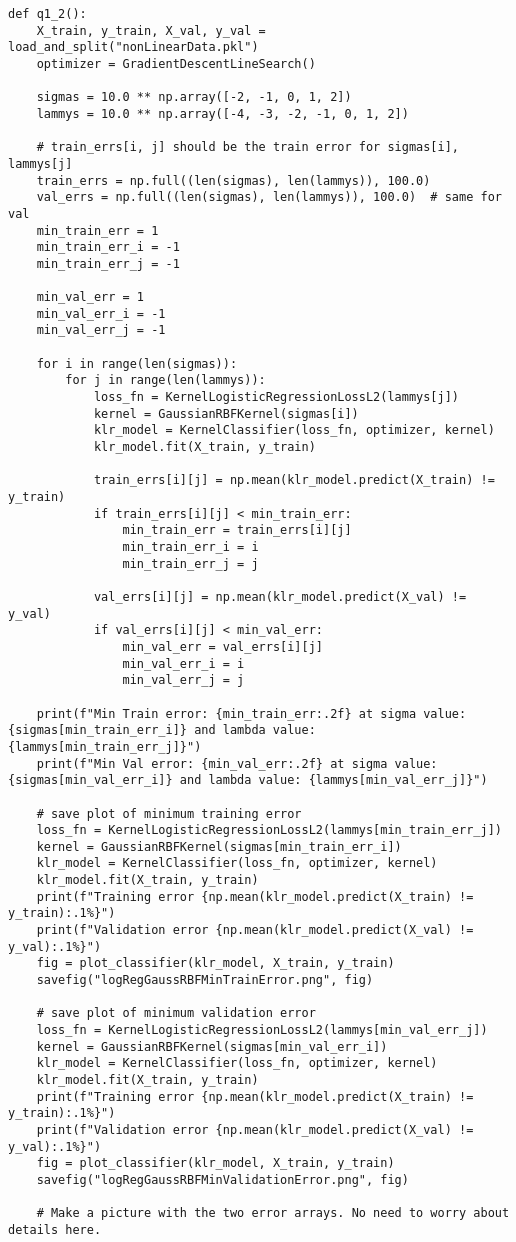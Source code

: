 \documentclass{article}
\begin{document}
\begin{verbatim}
def q1_2():
    X_train, y_train, X_val, y_val = load_and_split("nonLinearData.pkl")
    optimizer = GradientDescentLineSearch()

    sigmas = 10.0 ** np.array([-2, -1, 0, 1, 2])
    lammys = 10.0 ** np.array([-4, -3, -2, -1, 0, 1, 2])

    # train_errs[i, j] should be the train error for sigmas[i], lammys[j]
    train_errs = np.full((len(sigmas), len(lammys)), 100.0)
    val_errs = np.full((len(sigmas), len(lammys)), 100.0)  # same for val
    min_train_err = 1
    min_train_err_i = -1
    min_train_err_j = -1

    min_val_err = 1
    min_val_err_i = -1
    min_val_err_j = -1

    for i in range(len(sigmas)):
        for j in range(len(lammys)):
            loss_fn = KernelLogisticRegressionLossL2(lammys[j])
            kernel = GaussianRBFKernel(sigmas[i])
            klr_model = KernelClassifier(loss_fn, optimizer, kernel)
            klr_model.fit(X_train, y_train)

            train_errs[i][j] = np.mean(klr_model.predict(X_train) != y_train)
            if train_errs[i][j] < min_train_err:
                min_train_err = train_errs[i][j]
                min_train_err_i = i
                min_train_err_j = j

            val_errs[i][j] = np.mean(klr_model.predict(X_val) != y_val)
            if val_errs[i][j] < min_val_err:
                min_val_err = val_errs[i][j]
                min_val_err_i = i
                min_val_err_j = j

    print(f"Min Train error: {min_train_err:.2f} at sigma value: {sigmas[min_train_err_i]} and lambda value: {lammys[min_train_err_j]}")
    print(f"Min Val error: {min_val_err:.2f} at sigma value: {sigmas[min_val_err_i]} and lambda value: {lammys[min_val_err_j]}")

    # save plot of minimum training error
    loss_fn = KernelLogisticRegressionLossL2(lammys[min_train_err_j])
    kernel = GaussianRBFKernel(sigmas[min_train_err_i])
    klr_model = KernelClassifier(loss_fn, optimizer, kernel)
    klr_model.fit(X_train, y_train)
    print(f"Training error {np.mean(klr_model.predict(X_train) != y_train):.1%}")
    print(f"Validation error {np.mean(klr_model.predict(X_val) != y_val):.1%}")
    fig = plot_classifier(klr_model, X_train, y_train)
    savefig("logRegGaussRBFMinTrainError.png", fig)

    # save plot of minimum validation error
    loss_fn = KernelLogisticRegressionLossL2(lammys[min_val_err_j])
    kernel = GaussianRBFKernel(sigmas[min_val_err_i])
    klr_model = KernelClassifier(loss_fn, optimizer, kernel)
    klr_model.fit(X_train, y_train)
    print(f"Training error {np.mean(klr_model.predict(X_train) != y_train):.1%}")
    print(f"Validation error {np.mean(klr_model.predict(X_val) != y_val):.1%}")
    fig = plot_classifier(klr_model, X_train, y_train)
    savefig("logRegGaussRBFMinValidationError.png", fig)

    # Make a picture with the two error arrays. No need to worry about details here.
\end{verbatim}
\end{document}
